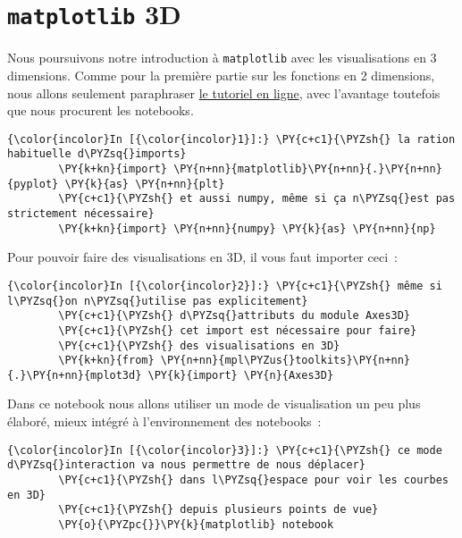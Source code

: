     
    
    
    

    

    \hypertarget{matplotlib-3d}{%
\section{\texorpdfstring{\texttt{matplotlib}
3D}{matplotlib 3D}}\label{matplotlib-3d}}

    Nous poursuivons notre introduction à \texttt{matplotlib} avec les
visualisations en 3 dimensions. Comme pour la première partie sur les
fonctions en 2 dimensions, nous allons seulement paraphraser
\href{https://matplotlib.org/mpl_toolkits/mplot3d/tutorial.html}{le
tutoriel en ligne}, avec l'avantage toutefois que nous procurent les
notebooks.

    \begin{Verbatim}[commandchars=\\\{\}]
{\color{incolor}In [{\color{incolor}1}]:} \PY{c+c1}{\PYZsh{} la ration habituelle d\PYZsq{}imports}
        \PY{k+kn}{import} \PY{n+nn}{matplotlib}\PY{n+nn}{.}\PY{n+nn}{pyplot} \PY{k}{as} \PY{n+nn}{plt}
        \PY{c+c1}{\PYZsh{} et aussi numpy, même si ça n\PYZsq{}est pas strictement nécessaire}
        \PY{k+kn}{import} \PY{n+nn}{numpy} \PY{k}{as} \PY{n+nn}{np}
\end{Verbatim}


    Pour pouvoir faire des visualisations en 3D, il vous faut importer
ceci~:

    \begin{Verbatim}[commandchars=\\\{\}]
{\color{incolor}In [{\color{incolor}2}]:} \PY{c+c1}{\PYZsh{} même si l\PYZsq{}on n\PYZsq{}utilise pas explicitement}
        \PY{c+c1}{\PYZsh{} d\PYZsq{}attributs du module Axes3D}
        \PY{c+c1}{\PYZsh{} cet import est nécessaire pour faire}
        \PY{c+c1}{\PYZsh{} des visualisations en 3D}
        \PY{k+kn}{from} \PY{n+nn}{mpl\PYZus{}toolkits}\PY{n+nn}{.}\PY{n+nn}{mplot3d} \PY{k}{import} \PY{n}{Axes3D}
\end{Verbatim}


    Dans ce notebook nous allons utiliser un mode de visualisation un peu
plus élaboré, mieux intégré à l'environnement des notebooks~:

    \begin{Verbatim}[commandchars=\\\{\}]
{\color{incolor}In [{\color{incolor}3}]:} \PY{c+c1}{\PYZsh{} ce mode d\PYZsq{}interaction va nous permettre de nous déplacer}
        \PY{c+c1}{\PYZsh{} dans l\PYZsq{}espace pour voir les courbes en 3D}
        \PY{c+c1}{\PYZsh{} depuis plusieurs points de vue}
        \PY{o}{\PYZpc{}}\PY{k}{matplotlib} notebook
\end{Verbatim}



